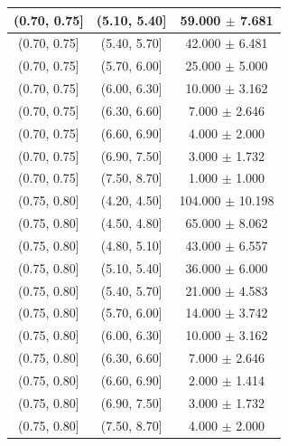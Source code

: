 \begin{longtable}{|c|c|c|}
\hline
(0.70, 0.75] & (5.10, 5.40] & 59.000 $\pm$ 7.681 \\ 
\hline
(0.70, 0.75] & (5.40, 5.70] & 42.000 $\pm$ 6.481 \\ 
\hline
(0.70, 0.75] & (5.70, 6.00] & 25.000 $\pm$ 5.000 \\ 
\hline
(0.70, 0.75] & (6.00, 6.30] & 10.000 $\pm$ 3.162 \\ 
\hline
(0.70, 0.75] & (6.30, 6.60] & 7.000 $\pm$ 2.646 \\ 
\hline
(0.70, 0.75] & (6.60, 6.90] & 4.000 $\pm$ 2.000 \\ 
\hline
(0.70, 0.75] & (6.90, 7.50] & 3.000 $\pm$ 1.732 \\ 
\hline
(0.70, 0.75] & (7.50, 8.70] & 1.000 $\pm$ 1.000 \\ 
\hline
(0.75, 0.80] & (4.20, 4.50] & 104.000 $\pm$ 10.198 \\ 
\hline
(0.75, 0.80] & (4.50, 4.80] & 65.000 $\pm$ 8.062 \\ 
\hline
(0.75, 0.80] & (4.80, 5.10] & 43.000 $\pm$ 6.557 \\ 
\hline
(0.75, 0.80] & (5.10, 5.40] & 36.000 $\pm$ 6.000 \\ 
\hline
(0.75, 0.80] & (5.40, 5.70] & 21.000 $\pm$ 4.583 \\ 
\hline
(0.75, 0.80] & (5.70, 6.00] & 14.000 $\pm$ 3.742 \\ 
\hline
(0.75, 0.80] & (6.00, 6.30] & 10.000 $\pm$ 3.162 \\ 
\hline
(0.75, 0.80] & (6.30, 6.60] & 7.000 $\pm$ 2.646 \\ 
\hline
(0.75, 0.80] & (6.60, 6.90] & 2.000 $\pm$ 1.414 \\ 
\hline
(0.75, 0.80] & (6.90, 7.50] & 3.000 $\pm$ 1.732 \\ 
\hline
(0.75, 0.80] & (7.50, 8.70] & 4.000 $\pm$ 2.000 \\ 
\hline
\end{longtable}
